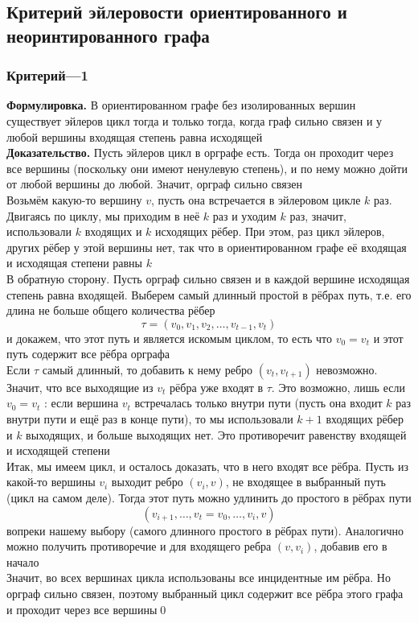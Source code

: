 \documentclass[a4paper]{article}
\begin{document}
\subsection{Критерий эйлеровости ориентированного и неоринтированного графа}
\subsubsection*{Критерий—1}
\textbf{Формулировка.} В ориентированном графе без изолированных вершин существует эйлеров цикл тогда и только тогда, когда граф сильно связен и у любой вершины входящая степень равна исходящей\\[2mm]
\textbf{Доказательство.} Пусть эйлеров цикл в орграфе есть. Тогда он проходит через все вершины (поскольку они имеют ненулевую степень), и по нему можно дойти от любой вершины до любой. Значит, орграф сильно связен\\[2mm]
Возьмём какую-то вершину $v$, пусть она встречается в эйлеровом цикле $k$ раз. Двигаясь по циклу, мы приходим в неё $k$ раз и уходим $k$ раз, значит, использовали $k$ входящих и $k$ исходящих рёбер. При этом, раз цикл эйлеров, других рёбер у этой вершины нет, так что в ориентированном графе её входящая и исходящая степени равны $k$\\[2mm]
В обратную сторону. Пусть орграф сильно связен и в каждой вершине исходящая степень равна входящей. Выберем самый длинный простой в рёбрах путь, т.е. его длина не больше общего количества рёбер
$$\tau=\left(v_0, v_1, v_2, \ldots, v_{t-1}, v_t\right)$$
и докажем, что этот путь и является искомым циклом, то есть что $v_0=v_t$ и этот путь содержит все рёбра орграфа\\[2mm]
 Если $\tau$ самый длинный, то добавить к нему ребро $\left(v_t, v_{t+1}\right)$ невозможно. Значит, что все выходящие из $v_t$ рёбра уже входят в $\tau$. Это возможно, лишь если $v_0=v_t$ : если вершина $v_t$ встречалась только внутри пути (пусть она входит $k$ раз внутри пути и ещё раз в конце пути), то мы использовали $k+1$ входящих рёбер и $k$ выходящих, и больше выходящих нет. Это противоречит равенству входящей и исходящей степени\\[2mm]
Итак, мы имеем цикл, и осталось доказать, что в него входят все рёбра. Пусть из какой-то вершины $v_i$ выходит ребро $\left(v_i, v\right)$, не входящее в выбранный путь (цикл на самом деле). Тогда этот путь можно удлинить до простого в рёбрах пути
$$\left(v_{i+1}, \ldots, v_t=v_0, \ldots, v_i, v\right)$$
вопреки нашему выбору (самого длинного простого в рёбрах пути). Аналогично можно получить противоречие и для входящего ребра $\left(v, v_i\right)$, добавив его в начало\\[2mm]
Значит, во всех вершинах цикла использованы все инцидентные им рёбра. Но орграф сильно связен, поэтому выбранный цикл содержит все рёбра этого графа и проходит через все вершины\qed
\end{document}
